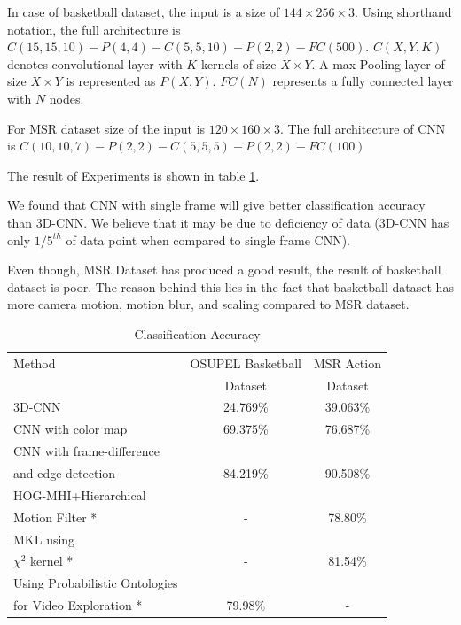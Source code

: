 In case of basketball dataset, the input is a size of $144 \times 256 \times 3$. Using shorthand notation, the full architecture is $C(15, 15, 10)-P(4, 4)-C(5, 5, 10)-P(2, 2)-FC(500)$. $C(X, Y, K)$ denotes convolutional layer with $K$ kernels of size $X \times Y$. A max-Pooling layer of size $X \times Y$ is represented as $P(X,Y)$. $FC(N)$ represents a fully connected layer with $N$ nodes. 

For MSR dataset size of the input is $120 \times 160 \times 3$. The full architecture of CNN is $C(10, 10, 7)-P(2, 2)-C(5, 5, 5)-P(2, 2)-FC(100)$

The result of Experiments is shown in table \ref{table:cnn_res}.

We found that CNN with single frame will give better classification accuracy than 3D-CNN. We believe that it may be due to deficiency of data (3D-CNN has only $1/5^{th}$ of data point when compared to single frame CNN).

Even though, MSR Dataset has produced a good result, the result of basketball dataset is poor. The reason behind this lies in the fact that basketball dataset has more camera motion, motion blur, and scaling compared to MSR dataset.


\begin{table}[h]
\centering
\begin{tabular}{|l|c|c|}
\hline
Method & OSUPEL Basketball& MSR Action\\
       & Dataset          &Dataset \\
\hline
\hline
3D-CNN  &24.769\%   &39.063\% \\
\hline
CNN with color map  &69.375\%   &76.687\% \\
\hline
CNN with frame-difference &&\\
and edge detection &84.219\%   &90.508\% \\
\hline
HOG-MHI+Hierarchical &&\\
Motion Filter * \citep{tian2012hierarchical} & -  &78.80\% \\
\hline
MKL using&&\\
$\chi^2$ kernel * \citep{zhao2014feature} & -  &81.54\% \\
\hline
 Using Probabilistic Ontologies&&\\
 for Video Exploration * \citep{bustamante2012using} & 79.98\%   & - \\
\hline  
\end{tabular}
\caption[Classification Accuracy]{Classification Accuracy}
\label{table:cnn_res}
\end{table} 


